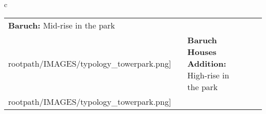 \begin{table}[H]
        \begin{tabular}{c}
        \begin{tabular}{m{1.25in} m{2in} m{.1in} m{1.25in} m{2in}}
\textbf{Baruch:} {Mid-rise in the park} & \texttt{[image: \\rootpath/IMAGES/typology\_towerpark.png]} & & \textbf{Baruch Houses Addition:} {High-rise in the park} & \texttt{[image: \\rootpath/IMAGES/typology\_towerpark.png]}
\end{tabular}\end{tabular}
        \end{table}